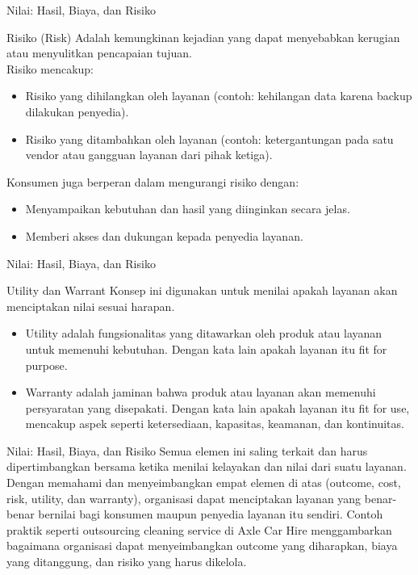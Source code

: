 \documentclass[aspectratio=179]{beamer}
\begin{document}
\begin{frame}{Nilai: Hasil, Biaya, dan Risiko}
    \begin{block}{Risiko (Risk)}
    Adalah kemungkinan kejadian yang dapat menyebabkan kerugian atau menyulitkan pencapaian tujuan.\\
    Risiko mencakup:
        \begin{itemize}
            \item Risiko yang dihilangkan oleh layanan (contoh: kehilangan data karena backup dilakukan penyedia).
            \item Risiko yang ditambahkan oleh layanan (contoh: ketergantungan pada satu vendor atau gangguan layanan dari pihak ketiga).
        \end{itemize}
        Konsumen juga berperan dalam mengurangi risiko dengan:
        \begin{itemize}
            \item Menyampaikan kebutuhan dan hasil yang diinginkan secara jelas.
            \item Memberi akses dan dukungan kepada penyedia layanan.
        \end{itemize}
    \end{block}
\end{frame}

\begin{frame}{Nilai: Hasil, Biaya, dan Risiko}
    \begin{block}{Utility dan Warrant}
    Konsep ini digunakan untuk menilai apakah layanan akan menciptakan nilai sesuai harapan.
        \begin{itemize}
            \item Utility adalah fungsionalitas yang ditawarkan oleh produk atau layanan untuk memenuhi kebutuhan. Dengan kata lain apakah layanan itu fit for purpose.
            \item Warranty adalah jaminan bahwa produk atau layanan akan memenuhi persyaratan yang disepakati. Dengan kata lain apakah layanan itu fit for use, mencakup aspek seperti ketersediaan, kapasitas, keamanan, dan kontinuitas.
        \end{itemize}
    \end{block}
\end{frame}

\begin{frame}{Nilai: Hasil, Biaya, dan Risiko}
    Semua elemen ini saling terkait dan harus dipertimbangkan bersama ketika menilai kelayakan dan nilai dari suatu layanan. Dengan memahami dan menyeimbangkan empat elemen di atas (outcome, cost, risk, utility, dan warranty), organisasi dapat menciptakan layanan yang benar-benar bernilai bagi konsumen maupun penyedia layanan itu sendiri. Contoh praktik seperti outsourcing cleaning service di Axle Car Hire menggambarkan bagaimana organisasi dapat menyeimbangkan outcome yang diharapkan, biaya yang ditanggung, dan risiko yang harus dikelola.
\end{frame}
\end{document}
